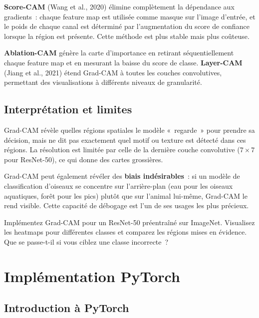 \documentclass[a4paper,11pt,twoside]{book}
\begin{document}
\textbf{Score-CAM} (Wang et al., 2020) élimine complètement la dépendance aux gradients~: chaque feature map est utilisée comme masque sur l'image d'entrée, et le poids de chaque canal est déterminé par l'augmentation du score de confiance lorsque la région est présente. Cette méthode est plus stable mais plus coûteuse.

\textbf{Ablation-CAM} génère la carte d'importance en retirant séquentiellement chaque feature map et en mesurant la baisse du score de classe. \textbf{Layer-CAM} (Jiang et al., 2021) étend Grad-CAM à toutes les couches convolutives, permettant des visualisations à différents niveaux de granularité.

\section{Interprétation et limites}

Grad-CAM révèle quelles régions spatiales le modèle «~regarde~» pour prendre sa décision, mais ne dit pas exactement quel motif ou texture est détecté dans ces régions. La résolution est limitée par celle de la dernière couche convolutive ($7 \times 7$ pour ResNet-50), ce qui donne des cartes grossières.

Grad-CAM peut également révéler des \textbf{biais indésirables}~: si un modèle de classification d'oiseaux se concentre sur l'arrière-plan (eau pour les oiseaux aquatiques, forêt pour les pics) plutôt que sur l'animal lui-même, Grad-CAM le rend visible. Cette capacité de débogage est l'un de ses usages les plus précieux.

\begin{exobox}[Exercice]
Implémentez Grad-CAM pour un ResNet-50 préentraîné sur ImageNet. Visualisez les heatmaps pour différentes classes et comparez les régions mises en évidence. Que se passe-t-il si vous ciblez une classe incorrecte~?
\end{exobox}


\chapter{Implémentation PyTorch}

\section{Introduction à PyTorch}
\end{document}
